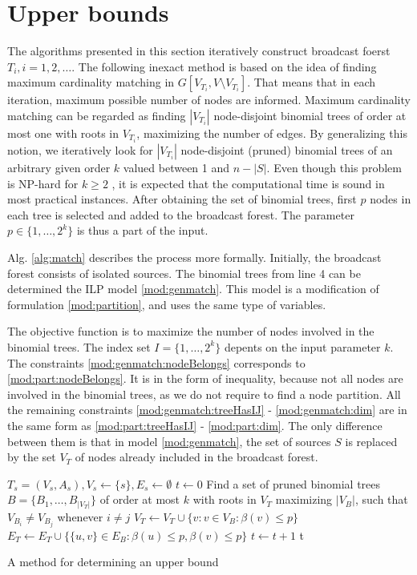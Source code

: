 \section{Upper bounds}

The algorithms presented in this section iteratively construct broadcast foerst $T_i, i=1,2,\dots$.
The following inexact method is based on the idea of finding maximum cardinality matching in $G\left[V_{T_i},V\setminus V_{T_i}\right]$.
That means that in each iteration, maximum possible number of nodes are informed.
Maximum cardinality matching can be regarded as finding $|V_{T_i}|$ node-disjoint  binomial trees of order at most one with roots in $V_{T_i}$, maximizing the number of edges.
By generalizing this notion, we iteratively look for $|V_{T_i}|$ node-disjoint (pruned) binomial trees of an arbitrary given order $k$ valued between 1 and $n-|S|$.
Even though this problem is NP-hard for $k\geq 2$ \cite{jansen95}, it is expected that the computational time is sound in most practical instances.
After obtaining the set of binomial trees, first $p$ nodes in each tree is selected and added to the broadcast forest.
The parameter $p\in \{1,\dots,2^k\}$ is thus a part of the input.

Alg. \ref{alg:match} describes the process more formally.
Initially, the broadcast forest consists of isolated sources.
The binomial trees from line 4 can be determined the ILP model \eqref{mod:genmatch}. 
This model is a modification of formulation \eqref{mod:partition}, and uses the same type of variables.


The objective function is to maximize the number of nodes involved in the binomial trees.
The index set $I=\{1,\dots,2^k\}$ depents on the input parameter $k$.
The constraints \eqref{mod:genmatch:nodeBelongs} corresponds to \eqref{mod:part:nodeBelongs}.
It is in the form of inequality, because not all nodes are involved in the binomial trees, as we do not require to find a node partition.
All the remaining constraints \eqref{mod:genmatch:treeHasIJ} - \eqref{mod:genmatch:dim} are in the same form as \eqref{mod:part:treeHasIJ} - \eqref{mod:part:dim}.
The only difference between them is that in model \eqref{mod:genmatch}, the set of sources $S$ is replaced by the set $V_T$ of nodes already included in the broadcast forest.

\begin{algorithm}[]
$T_s=(V_s,A_s), V_s\leftarrow \{s\}, E_s\leftarrow\emptyset$\;
$t\leftarrow 0$\;
 {
	Find a set of pruned binomial trees $B=\{B_1,\dots,B_{|V_T|}\}$ of order at most $k$ with roots in $V_T$ maximizing $|V_B|$, such that $V_{B_i}\neq V_{B_j}$ whenever $i\neq j$\;
	$V_T\leftarrow V_T\cup \{v:v\in V_B:\beta(v)\leq p\}$\;
	$E_T\leftarrow E_T\cup \{\{u,v\}\in E_B: \beta(u)\leq p,\beta(v)\leq p\}$\;
	$t\leftarrow t+1$\;
}
\Return t\;
 \caption{A method for determining an upper bound}
\label{alg:genub}
\end{algorithm}

